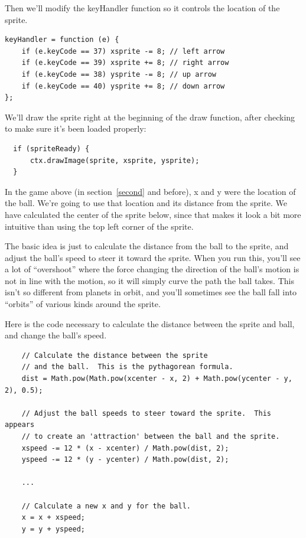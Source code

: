 \documentclass[11pt]{article}
\begin{document}
Then we'll modify the keyHandler function so it controls the location
of the sprite.

\begin{verbatim}
keyHandler = function (e) {
    if (e.keyCode == 37) xsprite -= 8; // left arrow
    if (e.keyCode == 39) xsprite += 8; // right arrow
    if (e.keyCode == 38) ysprite -= 8; // up arrow
    if (e.keyCode == 40) ysprite += 8; // down arrow
};
\end{verbatim}

We'll draw the sprite right at the beginning of the draw function,
after checking to make sure it's been loaded properly:

\begin{verbatim}
  if (spriteReady) {
      ctx.drawImage(sprite, xsprite, ysprite);
  }
\end{verbatim}

In the game above (in section~\ref{second} and before), x and y were
the location of the ball.  We're going to use that location and its
distance from the sprite.  We have calculated the center of the sprite
below, since that makes it look a bit more intuitive than using the
top left corner of the sprite.

The basic idea is just to calculate the distance from the ball to the
sprite, and adjust the ball's speed to steer it toward the sprite.
When you run this, you'll see a lot of ``overshoot'' where the force
changing the direction of the ball's motion is not in line with the
motion, so it will simply curve the path the ball takes.  This isn't
so different from planets in orbit, and you'll sometimes see the ball
fall into ``orbits'' of various kinds around the sprite.

Here is the code necessary to calculate the distance between the
sprite and ball, and change the ball's speed.

\begin{verbatim}
    // Calculate the distance between the sprite
    // and the ball.  This is the pythagorean formula.
    dist = Math.pow(Math.pow(xcenter - x, 2) + Math.pow(ycenter - y, 2), 0.5);

    // Adjust the ball speeds to steer toward the sprite.  This appears
    // to create an 'attraction' between the ball and the sprite.
    xspeed -= 12 * (x - xcenter) / Math.pow(dist, 2);
    yspeed -= 12 * (y - ycenter) / Math.pow(dist, 2);

    ...

    // Calculate a new x and y for the ball.
    x = x + xspeed;
    y = y + yspeed;

\end{verbatim}
\end{document}
